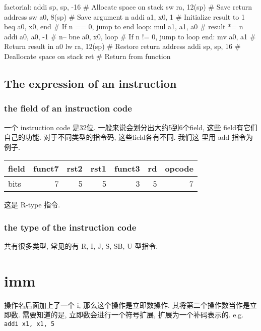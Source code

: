 \documentclass[11pt]{article}
\begin{document}
factorial:
    addi sp, sp, -16  \# Allocate space on stack
    sw ra, 12(sp)     \# Save return address
    sw a0, 8(sp)      \# Save argument n
    addi a1, x0, 1    \# Initialize result to 1
    beq a0, x0, end   \# If n == 0, jump to end
loop:
    mul a1, a1, a0    \# result *= n
    addi a0, a0, -1   \# n--
    bne a0, x0, loop  \# If n != 0, jump to loop
end:
    mv a0, a1         \# Return result in a0
    lw ra, 12(sp)     \# Restore return address
    addi sp, sp, 16   \# Deallocate space on stack
    ret               \# Return from function

\subsection{The expression of an instruction}
\label{sec:org5d16211}

\subsubsection{the field of an instruction code}
\label{sec:org4040100}

一个 instruction code 是32位. 一般来说会划分出大约5到6个field, 这些
field有它们自己的功能. 对于不同类型的指令码, 这些field各有不同. 我们这
里用 add 指令为例子.

\begin{center}
\begin{tabular}{lrrrrrr}
\hline
field & funct7 & rst2 & rst1 & funct3 & rd & opcode\\
\hline
bits & 7 & 5 & 5 & 3 & 5 & 7\\
\hline
\end{tabular}
\end{center}

这是 R-type 指令. 

\subsubsection{the type of the instruction code}
\label{sec:orgf54e921}

共有很多类型, 常见的有 R, I, J, S, SB, U 型指令. 



\section{imm}
\label{sec:orgf6d8eff}
操作名后面加上了一个 i, 那么这个操作是立即数操作. 
其将第二个操作数当作是立即数. 
需要知道的是, 立即数会进行一个符号扩展, 扩展为一个补码表示的.
e.g. \texttt{addi x1, x1, 5}
\end{document}
